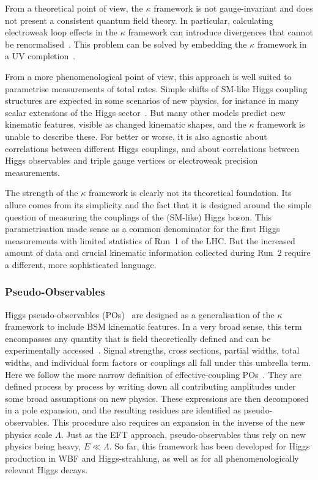 From a theoretical point of view, the $\kappa$ framework is not
gauge-invariant and does not present a consistent quantum field
theory. In particular, calculating electroweak loop effects in the
$\kappa$ framework can introduce divergences that cannot be
renormalised~\cite{Passarino:2012cb}. This problem can be solved by
embedding the $\kappa$ framework in a UV
completion~\cite{Lopez-Val:2013yba}.

From a more phenomenological point of view, this approach is well
suited to parametrise measurements of total rates. Simple shifts of
SM-like Higgs coupling structures are expected in some scenarios of
new physics, for instance in many scalar extensions of the Higgs
sector~\cite{Lopez-Val:2013yba}. But many other models predict new
kinematic features, visible as changed kinematic shapes, and the
$\kappa$ framework is unable to describe these. For better or worse,
it is also agnostic about correlations between different Higgs
couplings, and about correlations between Higgs observables and triple
gauge vertices or electroweak precision measurements.

The strength of the $\kappa$ framework is clearly not its theoretical
foundation. Its allure comes from its simplicity and the fact that it
is designed around the simple question of measuring the couplings of
the (SM-like) Higgs boson. This parametrisation made sense as a
common denominator for the first Higgs measurements with limited
statistics of Run~1 of the LHC. But the increased amount of data and
crucial kinematic information collected during Run~2 require a
different, more sophisticated language.



\subsubsection{Pseudo-Observables}

Higgs pseudo-observables (POs)~\cite{Isidori:2013cga, Bordone:2015nqa,
  Greljo:2015sla} are designed as a generalisation of the $\kappa$
framework to include BSM kinematic features. In a very broad sense,
this term encompasses any quantity that is field theoretically defined
and can be experimentally accessed~\cite{Krause:2016uhw}. Signal
strengths, cross sections, partial widths, total widths, and
individual form factors or couplings all fall under this umbrella
term. Here we follow the more narrow definition of effective-coupling
POs~\cite{deFlorian:2016spz}. They are defined process by process by
writing down all contributing amplitudes under some broad assumptions
on new physics. These expressions are then decomposed in a pole
expansion, and the resulting residues are identified as
pseudo-observables. This procedure also requires an expansion in the
inverse of the new physics scale $\Lambda$. Just as the EFT approach,
pseudo-observables thus rely on new physics being heavy,
$E \ll \Lambda$. So far, this framework has been developed for Higgs
production in WBF and Higgs-strahlung, as well as for all
phenomenologically relevant Higgs decays.

